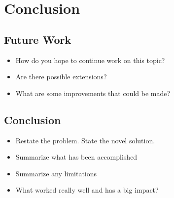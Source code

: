
\glsresetall %
\chapter[Conclusion]{Conclusion}\label{ch:Conclusion}

\section{Future Work}
\begin{itemize}
	\item{How do you hope to continue work on this topic?}
	\item{Are there possible extensions?}
	\item{What are some improvements that could be made?}
\end{itemize}

\section{Conclusion}
\begin{itemize}
	\item{Restate the problem. State the novel solution.}
	\item{Summarize what has been accomplished}
	\item{Summarize any limitations}
	\item{What worked really well and has a big impact?}
\end{itemize}
